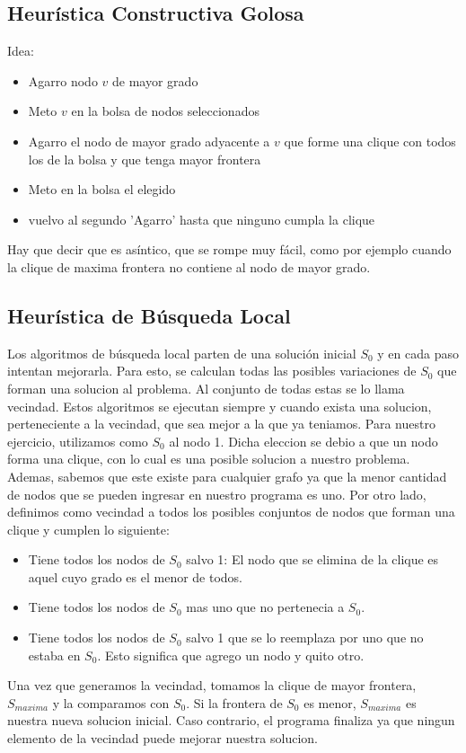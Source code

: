 \subsection{Heurística Constructiva Golosa}
Idea:
\begin{itemize}
\item Agarro nodo $v$ de mayor grado
\item Meto $v$ en la bolsa de nodos seleccionados
\item Agarro el nodo de mayor grado adyacente a $v$ que forme una clique con todos los de la bolsa y que tenga mayor frontera
\item Meto en la bolsa el elegido
\item vuelvo al segundo 'Agarro' hasta que ninguno cumpla la clique
\end{itemize}


Hay que decir que es asíntico, que se rompe muy fácil, como por ejemplo cuando la clique de maxima frontera no contiene al nodo de mayor grado.

\subsection{Heurística de Búsqueda Local}

Los algoritmos de búsqueda local parten de una solución inicial $S_{0}$ y en cada paso intentan mejorarla. Para esto, se calculan todas las posibles variaciones de $S_{0}$ que forman una solucion al problema. Al conjunto de todas estas se lo llama vecindad. 
Estos algoritmos se ejecutan siempre y cuando exista una solucion, perteneciente a la vecindad, que sea mejor a la que ya teniamos. \newline \newline
Para nuestro ejercicio, utilizamos como $S_{0}$ al nodo 1. Dicha eleccion se debio a que un nodo forma una clique, con lo cual es una posible solucion a nuestro problema. Ademas, sabemos que este existe para cualquier grafo ya que la menor cantidad de nodos que se pueden ingresar en nuestro programa es uno. Por otro lado, definimos como vecindad a todos los posibles conjuntos de nodos que forman una clique y cumplen lo siguiente:
\begin{itemize}
\item Tiene todos los nodos de $S_{0}$ salvo 1: \newline El nodo que se elimina de la clique es aquel cuyo grado es el menor de todos. 
\item Tiene todos los nodos de $S_{0}$ mas uno que no pertenecia a $S_{0}$.
\item Tiene todos los nodos de $S_{0}$ salvo 1 que se lo reemplaza por uno que no estaba en $S_{0}$. Esto significa que agrego un nodo y quito otro.
\end{itemize}
Una vez que generamos la vecindad, tomamos la clique de mayor frontera, $S_{maxima}$ y la comparamos con $S_{0}$. Si la frontera de $S_{0}$ es menor, $S_{maxima}$ es nuestra nueva solucion inicial. Caso contrario, el programa finaliza ya que ningun elemento de la vecindad puede mejorar nuestra solucion.



